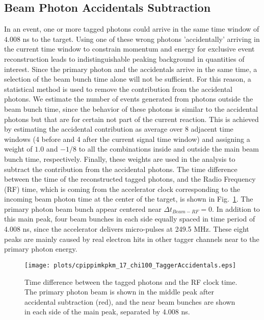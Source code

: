 \subsection{Beam Photon Accidentals Subtraction}
\label{chap.y2175.evt_sel.bea_pho_acc_sub}

In an event, one or more tagged photons could arrive in the same time window of $4.008$ ns to the target. Using one of these wrong photons 'accidentally' arriving in the current time window to constrain momentum and energy for exclusive event reconstruction leads to indistinguishable peaking background in quantities of interest. Since the primary photon and the accidentals arrive in the same time, a selection of the beam bunch time alone will not be sufficient. For this reason, a statistical method is used to remove the contribution from the accidental photons. We estimate the number of events generated from photons outside the beam bunch time, since the behavior of these photons is similar to the accidental photons but that are for certain not part of the current reaction. This is achieved by estimating the accidental contribution as average over 8 adjacent time windows (4 before and 4 after the current signal time window) and assigning a weight of $1.0$ and $-1/8$ to all the combinations inside and outside the main beam bunch time, respectively. Finally, these weights are used in the analysis to subtract the contribution from the accidental photons. The time difference between the time of the reconstructed tagged photons, and the Radio Frequency (RF) time, which is coming from the accelerator clock corresponding to the incoming beam photon time at the center of the target, is shown in Fig.~\ref{fig.chap.y2175.evt_sel.bea_pho_acc_sub}. The primary photon beam bunch appear centered near $\Delta t_{Beam-RF} = 0$. In addition to this main peak, four beam bunches in each side equally spaced in time period of 4.008 ns, since the accelerator delivers micro-pulses at 249.5 MHz. These eight peaks are mainly caused by real electron hits in other tagger channels near to the primary photon energy.

\begin{figure}[H]
    \centering
        \texttt{[image: plots/cpippimkpkm\_17\_chi100\_TaggerAccidentals.eps]}
        \caption{Time difference between the tagged photons and the RF clock time. The primary photon beam is shown in the middle peak after accidental subtraction (red), and the near beam bunches are shown in each side of the main peak, separated by 4.008 ns.}
        \label{fig.chap.y2175.evt_sel.bea_pho_acc_sub}
\end{figure}

